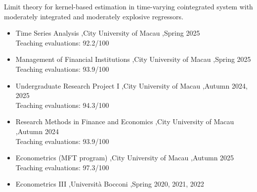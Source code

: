 \documentclass[letterpaper,10pt]{article}
\begin{document}

\begin{etaremune}
  \item Limit theory for kernel-based estimation in time-varying cointegrated system with moderately integrated and moderately explosive regressors.
\end{etaremune}


\begin{itemize}
  \item Time Series Analysis \sep City University of Macau \sep Spring 2025\\
        Teaching evaluations: 92.2/100
  \item Management of Financial Institutions \sep City University of Macau \sep Spring 2025\\
        Teaching evaluations: 93.9/100
  \item Undergraduate Research Project I \sep City University of Macau \sep Autumn 2024, 2025\\
        Teaching evaluations: 94.3/100
  \item Research Methods in Finance and Economics \sep City University of Macau \sep Autumn 2024\\
        Teaching evaluations: 93.9/100
\end{itemize}


\begin{itemize}
\item Econometrics (MFT program) \sep City University of Macau \sep Autumn 2025 \\
       Teaching evaluations: 97.3/100
  \item Econometrics III \sep Universit\`a Bocconi \sep Spring 2020, 2021, 2022
\end{itemize}

\end{document}
